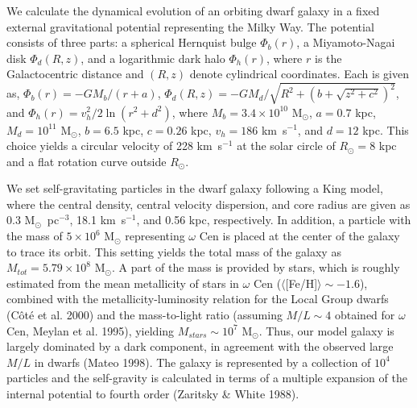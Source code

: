\documentclass[preprint,12pt]{aastex}
\begin{document}
We calculate the dynamical evolution of an orbiting dwarf galaxy in a fixed
external gravitational potential representing the Milky Way. The potential
consists of three parts: a spherical Hernquist bulge
$\Phi_b(r)$, a Miyamoto-Nagai disk $\Phi_d (R,z)$, and a logarithmic
dark halo $\Phi_h(r)$, where $r$ is the Galactocentric distance and
$(R,z)$ denote cylindrical coordinates. Each is given as,
$\Phi_b (r) = - GM_b/(r+a)$, $\Phi_d(R,z) =
- GM_d/\sqrt{R^2+(b+\sqrt{z^2+c^2})^2}$,
and $\Phi_h(r) = v_h^2 /2 \ln(r^2+d^2)$,
where $M_b=3.4\times 10^{10}$ M$_\odot$, $a=0.7$ kpc,
$M_d=10^{11}$ M$_\odot$, $b=6.5$ kpc, $c=0.26$ kpc, $v_h=186$ km~s$^{-1}$,
and $d=12$ kpc. This choice yields a circular velocity
of 228 km~s$^{-1}$ at the solar circle of $R_\odot=8$ kpc and a flat
rotation curve outside $R_\odot$.

We set self-gravitating particles in the dwarf galaxy following a King
model, where the central density, central velocity dispersion, and core radius
are given as 0.3 M$_\odot$~pc$^{-3}$, 18.1 km~s$^{-1}$, and 0.56 kpc,
respectively. In addition, a particle with the mass of $5 \times 10^6$
M$_\odot$ representing $\omega$ Cen is placed at the center of the
galaxy to trace its orbit. This setting yields the total mass of the galaxy as
$M_{tot}=5.79 \times 10^8$ M$_\odot$. A part of the mass is provided by
stars, which is roughly estimated from the mean metallicity of
stars in $\omega$ Cen ($\langle$[Fe/H]$\rangle\sim-1.6$), combined
with the metallicity-luminosity relation for the Local Group dwarfs
(C\^{o}t\'{e} et al. 2000) and the mass-to-light ratio (assuming $M/L \sim 4$
obtained for $\omega$ Cen, Meylan et al. 1995),
yielding $M_{stars}\sim 10^7$ M$_\odot$. Thus, our model galaxy
is largely dominated by a dark component, in agreement with the observed
large $M/L$ in dwarfs (Mateo 1998). The galaxy is
represented by a collection of $10^4$ particles and the self-gravity is
calculated in terms of a multiple expansion of the internal potential to
fourth order (Zaritsky \& White 1988).
\end{document}
